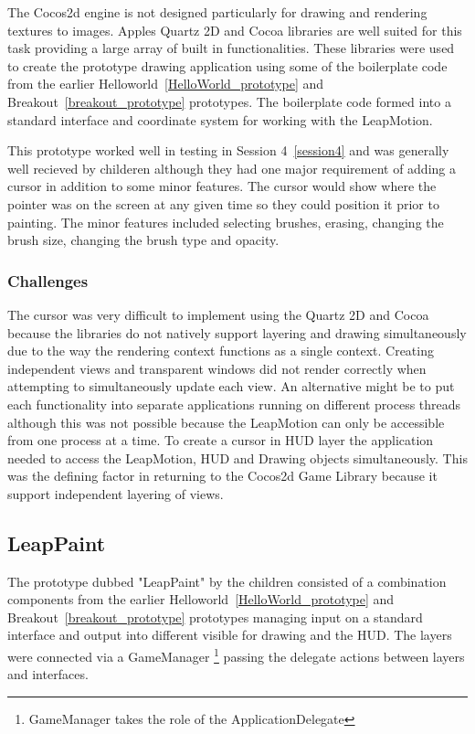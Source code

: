 The Cocos2d engine is not designed particularly for drawing and rendering textures to images. Apples Quartz 2D and Cocoa libraries are well suited for this task providing a large array of built in functionalities. These libraries were used to create the prototype drawing application using some of the boilerplate code from the earlier Helloworld~\ref{HelloWorld_prototype} and Breakout~\ref{breakout_prototype} prototypes. The boilerplate code formed into a standard interface and coordinate system for working with the LeapMotion. \cite{appleapi}


This prototype worked well in testing in Session 4~\ref{session4} and was generally well recieved by childeren although they had one major requirement of adding a cursor in addition to some minor features. The cursor would show where the pointer was on the screen at any given time so they could position it prior to painting. The minor features included selecting brushes, erasing, changing the brush size, changing the brush type and opacity.  

\subsubsection{Challenges}
The cursor was very difficult to implement using the Quartz 2D and Cocoa because the libraries do not natively support layering and drawing simultaneously due to the way the rendering context functions as a single context. Creating independent views and transparent windows did not render correctly when attempting to simultaneously update each view. An alternative might be to put each functionality into separate applications running on different process threads although this was not possible because the LeapMotion can only be accessible from one process at a time. To create a cursor in  HUD layer the application needed to access the LeapMotion, HUD and Drawing objects simultaneously. This was the defining factor in returning to the Cocos2d Game Library because it support independent layering of views. \cite{appleapi}

\subsection{LeapPaint}\label{leappaint_prototype}

The prototype dubbed "LeapPaint" by the children consisted of a combination components from the earlier Helloworld~\ref{HelloWorld_prototype} and Breakout~\ref{breakout_prototype} prototypes managing input on a standard interface and output into different visible for drawing and the HUD. The layers were connected via a GameManager \footnote{GameManager takes the role of the ApplicationDelegate} passing the delegate actions between layers and interfaces. 


